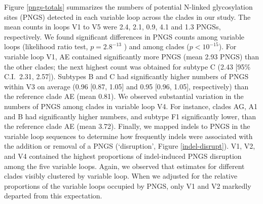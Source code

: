 \documentclass[12pt]{article}
\newcommand{\todo}[2]{\hl{\textbf{#1:} #2}}
\providecommand{\DIFadd}[1]{{\protect\color{blue}\uwave{#1}}} %
\providecommand{\DIFaddbegin}{} %
\providecommand{\DIFaddend}{} %
\newcommand{\DIFaddincludegraphics}[2][]{{\color{blue}\fbox{\DIFOincludegraphics[#1]{#2}}}} %
\DeclareRobustCommand{\DIFaddbegin}{\DIFOaddbegin \let\includegraphics\DIFaddincludegraphics} %
\DeclareRobustCommand{\DIFaddend}{\DIFOaddend \let\includegraphics\DIFOincludegraphics} %
\begin{document}
Figure \ref{pngs-totals} summarizes the numbers of potential N-linked glycosylation sites (PNGS) detected in each variable loop across the clades in our study.
The mean counts in loops V1 to V5 were 2.4, 2.1, 0.9, 4.1 and 1.3 PNGSs, respectively.
We found significant differences in PNGS counts among variable loops (likelihood ratio test, $p=2.8^{-13}$ ) and among clades ($p <10^{-15}$).
For variable loop V1, \DIFaddbegin \DIFadd{01\_}\DIFaddend AE contained significantly more PNGS (mean 2.93 PNGS) than the other clades; the next highest count was obtained for subtype C (2.43 [95\% C.I.~2.31, 2.57]).
Subtypes B and C had significantly higher numbers of PNGS within V3 on average (0.96 [0.87, 1.05] and 0.95 [0.96, 1.05], respectively) than the reference clade \DIFaddbegin \DIFadd{01\_}\DIFaddend AE (mean 0.81).
We observed substantial variation in the numbers of PNGS among clades in variable loop V4.
For instance, clades \DIFaddbegin \DIFadd{02\_}\DIFaddend AG, A1 and B had significantly higher numbers, and subtype F1 significantly lower, than the reference clade \DIFaddbegin \DIFadd{01\_}\DIFaddend AE (mean 3.72).
Finally, we mapped indels to PNGS in the variable loop sequences to determine how frequently indels were associated with the addition or removal of a PNGS (`disruption', Figure \ref{indel-disrupt}). 
V1, V2, and V4 contained the highest proportions of indel-induced PNGS disruption among the five variable loops.
Again, we observed that estimates for different clades visibly clustered by variable loop.
When we adjusted for the relative proportions of the variable loops occupied by PNGS, only V1 and V2 markedly departed from this expectation.
\end{document}
